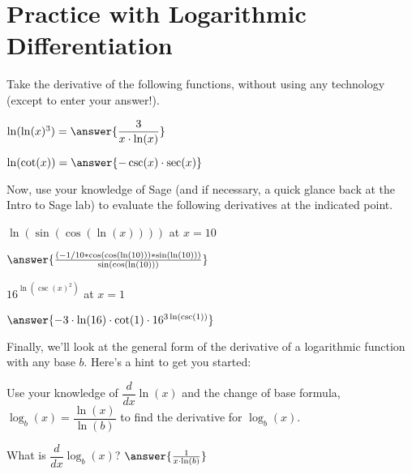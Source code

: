 \documentclass{ximera}
\begin{document}
\section{Practice with Logarithmic Differentiation}
Take the derivative of the following functions, without using any technology (except to enter your answer!).
\begin{problem}
$\ln(\ln(x)^3)=\answer{\dfrac{3}{x\cdot \ln(x)}}$
\end{problem}

\begin{problem}
$\ln(\cot(x))=\answer{-\csc(x)\cdot\sec(x)}$
\end{problem}

Now, use your knowledge of Sage (and if necessary, a quick glance back at the Intro to Sage lab) to evaluate the following derivatives at the indicated point.

\begin{onlineOnly}
\begin{sageCell}

\end{sageCell}
\end{onlineOnly}

\begin{problem}
$\ln(\sin(\cos(\ln(x))))$ at $x=10$

$\answer{\frac{(-1/10*\cos(\cos(\ln(10)))*\sin(\ln(10)))}{\sin(\cos(\ln(10)))}}$
\end{problem}

\begin{problem}
$16^{\ln(\csc(x)^2)}$ at $x = 1$

$\answer{-3\cdot\ln(16)\cdot\cot(1)\cdot 16^{3\ln(\csc(1))}}$
\end{problem}

Finally, we'll look at the general form of the derivative of a logarithmic function with any base $b$. Here's a hint to get you started:

Use your knowledge of $\dfrac{d}{dx} \ln(x)$ and the change of base formula, $\log_b(x) = \dfrac{\ln(x)}{\ln(b)}$ to find the derivative for $\log_b(x)$.
\begin{problem}
What is $\dfrac{d}{dx}\log_b(x)$?
$\answer{\frac{1}{x\cdot\ln(b)}}$
\end{problem}
\end{document}
